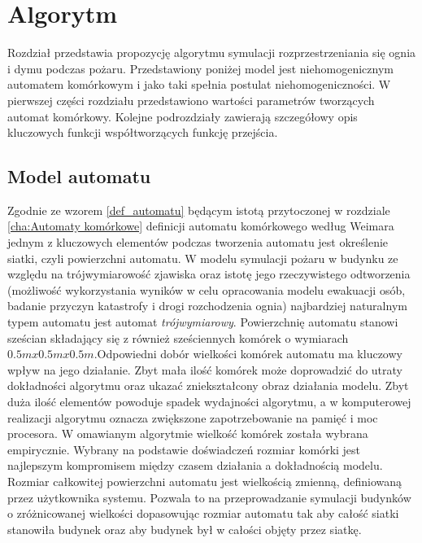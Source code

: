 ﻿%
\chapter{Algorytm}
\label{cha:Algorytm}
Rozdział przedstawia propozycję algorytmu symulacji rozprzestrzeniania się ognia i dymu podczas pożaru.
Przedstawiony poniżej model jest niehomogenicznym automatem komórkowym i jako taki spełnia postulat niehomogeniczności.
W pierwszej części rozdziału przedstawiono wartości parametrów tworzących automat komórkowy. Kolejne podrozdziały 
zawierają szczegółowy opis kluczowych funkcji współtworzących funkcję przejścia.
\section {Model automatu}
Zgodnie ze wzorem \ref{def_automatu} będącym istotą przytoczonej w rozdziale \ref{cha:Automaty komórkowe} definicji automatu komórkowego według Weimara jednym z kluczowych elementów podczas tworzenia automatu jest określenie siatki, czyli powierzchni automatu. W modelu symulacji pożaru w budynku
ze względu na trójwymiarowość zjawiska oraz istotę jego rzeczywistego odtworzenia (możliwość wykorzystania wyników w celu
opracowania modelu ewakuacji osób, badanie przyczyn katastrofy i drogi rozchodzenia ognia) najbardziej naturalnym typem automatu 
jest automat \textsl {trójwymiarowy}. Powierzchnię automatu stanowi sześcian składający się z również sześciennych komórek o wymiarach $0.5m x 0.5m x 0.5m$.Odpowiedni dobór wielkości komórek automatu ma kluczowy wpływ na jego działanie. Zbyt mała ilość komórek może doprowadzić do utraty
dokładności algorytmu oraz ukazać zniekształcony obraz działania modelu. Zbyt duża ilość elementów powoduje spadek wydajności algorytmu, a w komputerowej realizacji algorytmu oznacza zwiększone zapotrzebowanie na pamięć i moc procesora. W omawianym algorytmie
wielkość komórek została wybrana empirycznie.
Wybrany na podstawie doświadczeń rozmiar komórki jest najlepszym
kompromisem między czasem działania a dokładnością modelu.
Rozmiar całkowitej powierzchni automatu jest wielkością zmienną, definiowaną przez użytkownika systemu. Pozwala to na przeprowadzanie symulacji budynków o zróżnicowanej wielkości dopasowując rozmiar automatu tak aby całość
siatki stanowiła budynek oraz aby budynek był w całości objęty przez siatkę. 




